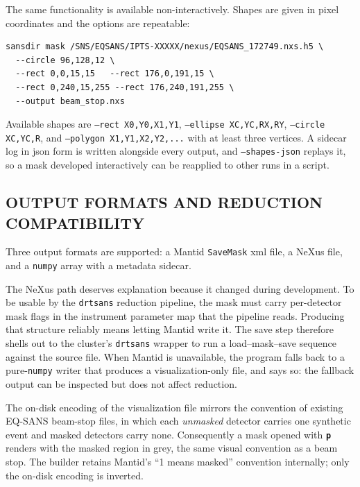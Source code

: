 \documentclass[tm]{ornltm}
\newcommand{\key}[1]{\textbf{\texttt{#1}}}
\begin{document}
The same functionality is available non-interactively. Shapes are given in pixel
coordinates and the options are repeatable:

\begin{lstlisting}[language=shellsession]
sansdir mask /SNS/EQSANS/IPTS-XXXXX/nexus/EQSANS_172749.nxs.h5 \
  --circle 96,128,12 \
  --rect 0,0,15,15   --rect 176,0,191,15 \
  --rect 0,240,15,255 --rect 176,240,191,255 \
  --output beam_stop.nxs
\end{lstlisting}

Available shapes are \texttt{--rect X0,Y0,X1,Y1}, \texttt{--ellipse
XC,YC,RX,RY}, \texttt{--circle XC,YC,R}, and \texttt{--polygon
X1,Y1,X2,Y2,...} with at least three vertices. A sidecar log in \ac{json} form
is written alongside every output, and \texttt{--shapes-json} replays it, so a
mask developed interactively can be reapplied to other runs in a script.

\subsection{OUTPUT FORMATS AND REDUCTION COMPATIBILITY}

Three output formats are supported: a Mantid \texttt{SaveMask} \ac{xml} file, a
NeXus file, and a \texttt{numpy} array with a metadata sidecar.

The NeXus path deserves explanation because it changed during development. To be
usable by the \texttt{drtsans} reduction pipeline, the mask must carry per-detector
mask flags in the instrument parameter map that the pipeline reads. Producing
that structure reliably means letting Mantid write it. The save step therefore
shells out to the cluster's \texttt{drtsans} wrapper to run a
load--mask--save sequence against the source file. When Mantid is unavailable,
the program falls back to a pure-\texttt{numpy} writer that produces a
visualization-only file, and says so: the fallback output can be inspected but
does not affect reduction.

The on-disk encoding of the visualization file mirrors the convention of existing
EQ-SANS beam-stop files, in which each \emph{unmasked} detector carries one
synthetic event and masked detectors carry none. Consequently a mask opened with
\key{p} renders with the masked region in grey, the same visual convention as a
beam stop. The builder retains Mantid's ``1 means masked'' convention internally;
only the on-disk encoding is inverted.

\end{document}
